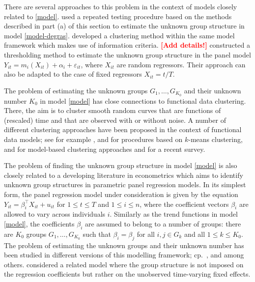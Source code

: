 \documentclass[a4paper,12pt]{article}
\begin{document}
\begin{itemize}[label=--,leftmargin=0.5cm]
There are several approaches to this problem in the context of models closely related to \eqref{model}. \cite{DegrasWu2012} used a repeated testing procedure based on the methods described in part (a) of this section to estimate the unknown group structure in model \eqref{model-degras}. \cite{Zhang2013} developed a clustering method within the same model framework which makes use of information criteria. \textcolor{red}{\textbf{[Add details!]}} \cite{VogtLinton2017} constructed a thresholding method to estimate the unknown group structure in the panel model $Y_{it} = m_i(X_{it}) + \alpha_i + \varepsilon_{it}$, where $X_{it}$ are random regressors. Their approach can also be adapted to the case of fixed regressors $X_{it} = t/T$. 


The problem of estimating the unknown groups $G_1,\ldots,G_{K_0}$ and their unknown number $K_0$ in model \eqref{model} has close connections to functional data clustering. There, the aim is to cluster smooth random curves that are functions of (rescaled) time and that are observed with or without noise. A number of different clustering approaches have been proposed in the context of functional data models; see for example \cite{Abraham2003}, \cite{Tarpey2003} and \cite{Tarpey2007} for procedures based on $k$-means clustering, \cite{James2003} and \cite{Chiou2007} for model-based clustering approaches and \cite{Jacques2014} for a recent survey. 


The problem of finding the unknown group structure in model \eqref{model} is also closely related to a developing literature in econometrics which aims to identify unknown group structures in parametric panel regression models. In its simplest form, the panel regression model under consideration is given by the equation $Y_{it} = \beta_i^\top X_{it} + u_{it}$ for $1 \le t \le T$ and $1 \le i \le n$, where the coefficient vectors $\beta_i$ are allowed to vary across individuals $i$. Similarly as the trend functions in model \eqref{model}, the coefficients $\beta_i$ are assumed to belong to a number of groups: there are $K_0$ groups $G_1,\ldots,G_{K_0}$ such that $\beta_i = \beta_j$ for all $i,j \in G_k$ and all $1\le k \le K_0$. The problem of estimating the unknown groups and their unknown number has been studied in different versions of this modelling framework; cp.\ \cite{Su2016}, \cite{Su2018} and \cite{Wang2018} among others. \cite{Bonhomme2015} considered a related model where the group structure is not imposed on the regression coefficients but rather on the unobserved time-varying fixed effects. 



\end{itemize}
\end{document}
